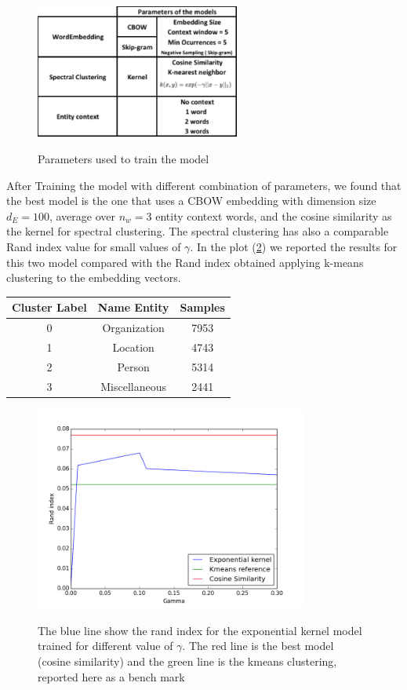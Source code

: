 \documentclass[]{article}
\begin{document}
\begin{figure}[h]
	\caption{Parameters used to train the model}
	\centering
	\includegraphics[width=0.6\textwidth]{Figures_Mik/Parameters.png}
	\label{fig:gull}
\end{figure}


After Training the model with different combination of parameters, we found that the best model is the one that uses a CBOW embedding with dimension size $d_E=100$, average over $n_w=3$ entity context words, and the cosine similarity as the kernel for spectral clustering. The spectral clustering has also a comparable Rand index value for small values of $\gamma$. In the plot (\ref{fig:best}) we reported the results for this two model compared with the Rand index obtained applying k-means clustering to the embedding vectors. 

\begin{center}
	\begin{tabular}{ |c|c|c|} 
		\hline
		Cluster Label & Name Entity & Samples\\
		\hline
	0 & Organization & 7953\\
		\hline
1 & Location & 4743\\
		\hline
 2 & Person & 5314\\
		\hline
 3 & Miscellaneous & 2441\\
		\hline
	\end{tabular}
\end{center}


	\begin{figure}[h]
	\centering
	\includegraphics[width=0.8\textwidth]{Figures_Mik/results.png} 
	\label{fig:best}
	\caption{The blue line show the rand index for the  exponential kernel model trained for different value of $\gamma$. The red line is the best model (cosine similarity) and the green line is the kmeans clustering, reported here as a bench mark } 
\end{figure}
\end{document}
